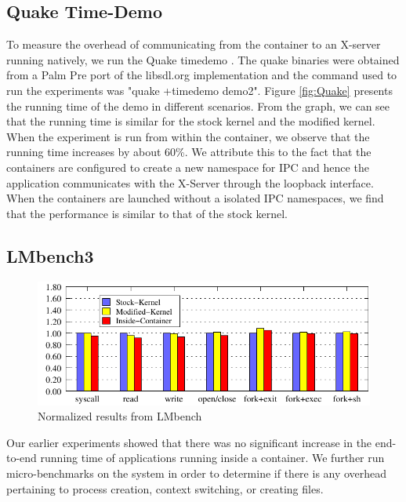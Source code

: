 \subsection{Quake Time-Demo}
\label{sec:quake_demo}
To measure the overhead of communicating from the container to an X-server running natively, we run the Quake timedemo . The quake binaries were obtained from a Palm Pre port of the libsdl.org implementation and the command used to run the experiments was "quake +timedemo demo2". Figure \ref{fig:Quake} presents the running time of the demo in different scenarios. From the graph, we can see that the running time is similar for the stock kernel and the modified kernel. When the experiment is run from within the container, we observe that the running time increases by about 60\%. We attribute this to the fact that the containers are configured to create a new namespace for IPC and hence the application communicates with the X-Server through the loopback interface. When the containers are launched without a isolated IPC namespaces, we find that the performance is similar to that of the stock kernel.

\subsection{LMbench3} 
\label{sec:LMbench3}

\begin{figure}[bth]
\centering
\includegraphics[width=2.0\columnwidth]{lmbench}
\caption{Normalized results from LMbench}
\label{fig:lmbench}
\end{figure}

Our earlier experiments showed that there was no significant increase in the end-to-end running time of applications running inside a container.  We further run micro-benchmarks on the system in order to determine if there is any overhead pertaining to process creation, context switching, or creating files.


